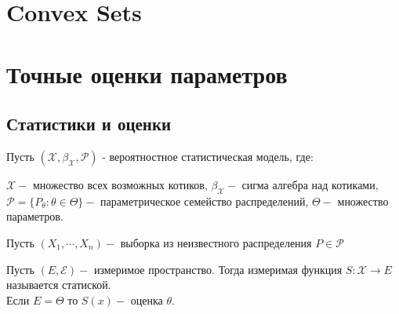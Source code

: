 \documentclass[11pt,fleqn]{book} %
\begin{document}
\pagestyle{fancy} %


\chapter{Convex Sets}
\chapter{Точные оценки параметров}
\section{Статистики и оценки}
Пусть $(\mathcal{X}, \mathcal{\beta}_{\mathcal{X}}, \mathcal{P})$ - вероятностное статистическая модель, где: 
\begin{remark}
$\mathcal{X} - $ множество всех возможных котиков,
$\mathcal{\beta}_\mathcal{X} - $  сигма алгебра над котиками,
$\mathcal{P} =  \{P_\theta : \theta \in \Theta\} - $  параметрическое семейство распределений,
$\Theta - $ множество параметров.
\end{remark}
Пусть $(X_1, \cdots, X_n) - $ выборка из неизвестного распределения $P \in \mathcal{P}$
\begin{defi}[Статистика]
Пусть $(E, \mathcal{E}) - $ измеримое пространство. Тогда измеримая функция $S:\mathcal{X} \rightarrow E$  называется статиской. \\
Если $E = \Theta$ то $S(x) - $ оценка $\theta$.
\end{defi}
\end{document}
